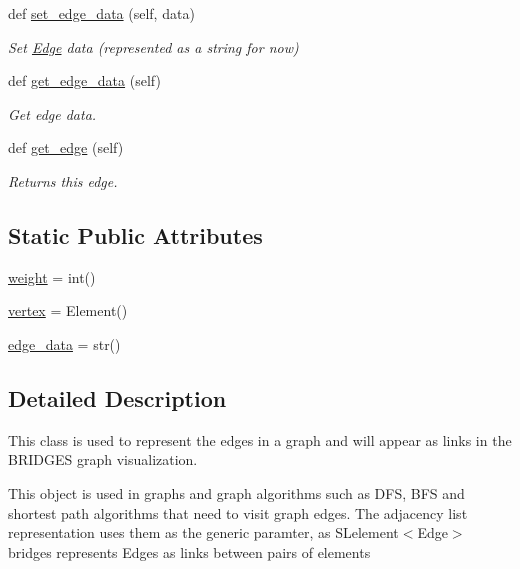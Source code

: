\begin{DoxyCompactItemize}
def \mbox{\hyperlink{class_bridges_1_1edge_1_1_edge_aa9ca872601b29ed48d492c7a54a1cc42}{set\+\_\+edge\+\_\+data}} (self, data)
\begin{DoxyCompactList}\small\item\em Set \mbox{\hyperlink{class_bridges_1_1edge_1_1_edge}{Edge}} data (represented as a string for now) \end{DoxyCompactList}\item 
def \mbox{\hyperlink{class_bridges_1_1edge_1_1_edge_a37f3fa415dc037ee5ef32aafc3c24792}{get\+\_\+edge\+\_\+data}} (self)
\begin{DoxyCompactList}\small\item\em Get edge data. \end{DoxyCompactList}\item 
def \mbox{\hyperlink{class_bridges_1_1edge_1_1_edge_a00fbdf3e8b0e05e00647cd2a32b25beb}{get\+\_\+edge}} (self)
\begin{DoxyCompactList}\small\item\em Returns this edge. \end{DoxyCompactList}\end{DoxyCompactItemize}
\subsection*{Static Public Attributes}
\begin{DoxyCompactItemize}
\item 
\mbox{\hyperlink{class_bridges_1_1edge_1_1_edge_a36787799fbbb1cd17fe1944d92513524}{weight}} = int()
\item 
\mbox{\hyperlink{class_bridges_1_1edge_1_1_edge_a785d6e63ec4a7ec1b49c9e4a81a802dc}{vertex}} = Element()
\item 
\mbox{\hyperlink{class_bridges_1_1edge_1_1_edge_a7677bdbf69f6a1725be3bb79e2bb1c7e}{edge\+\_\+data}} = str()
\end{DoxyCompactItemize}


\subsection{Detailed Description}
This class is used to represent the edges in a graph and will appear as links in the B\+R\+I\+D\+G\+ES graph visualization. 

This object is used in graphs and graph algorithms such as D\+FS, B\+FS and shortest path algorithms that need to visit graph edges. The adjacency list representation uses them as the generic paramter, as S\+Lelement$<$\+Edge$>$ bridges represents Edges as links between pairs of elements

